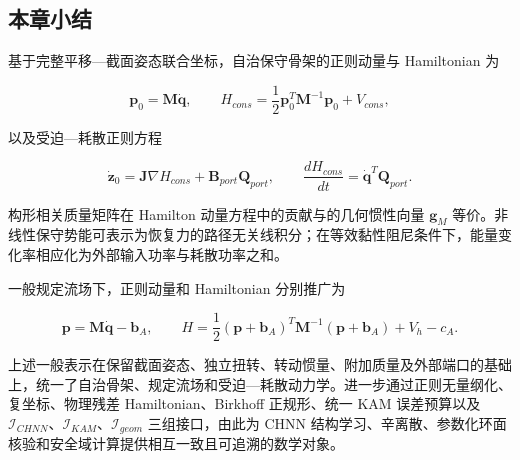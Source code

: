 \subsection{本章小结}\label{sec:hamiltonian-3-8}

基于完整平移---截面姿态联合坐标，自治保守骨架的正则动量与 Hamiltonian 为

\begin{equation}
\label{eq:hamiltonian-3-105}
\boxed{\mathbf{p}_{0} = \mathbf{M}\dot{\mathbf{q}},\quad\quad H_{cons} = \frac{1}{2}\mathbf{p}_{0}^{T}\mathbf{M}^{- 1}\mathbf{p}_{0} + V_{cons},}
\end{equation}

以及受迫---耗散正则方程

\begin{equation}
\label{eq:hamiltonian-3-106}
\boxed{{\dot{\mathbf{z}}}_{0} = \mathbf{J}\nabla H_{cons} + \mathbf{B}_{port}\mathbf{Q}_{port},\quad\quad\frac{dH_{cons}}{dt} = {\dot{\mathbf{q}}}^{T}\mathbf{Q}_{port}.}
\end{equation}

构形相关质量矩阵在 Hamilton 动量方程中的贡献与的几何惯性向量 \(\mathbf{g}_{M}\) 等价。非线性保守势能可表示为恢复力的路径无关线积分；在等效黏性阻尼条件下，能量变化率相应化为外部输入功率与耗散功率之和。

一般规定流场下，正则动量和 Hamiltonian 分别推广为

\begin{equation}
\label{eq:hamiltonian-3-107}
\boxed{\mathbf{p} = \mathbf{M}\dot{\mathbf{q}} - \mathbf{b}_{A},\quad\quad H = \frac{1}{2}\left( \mathbf{p} + \mathbf{b}_{A} \right)^{T}\mathbf{M}^{- 1}\left( \mathbf{p} + \mathbf{b}_{A} \right) + V_{h} - c_{A}.}
\end{equation}

上述一般表示在保留截面姿态、独立扭转、转动惯量、附加质量及外部端口的基础上，统一了自治骨架、规定流场和受迫---耗散动力学。进一步通过正则无量纲化、复坐标、物理残差 Hamiltonian、Birkhoff 正规形、统一 KAM 误差预算以及 \(\mathcal{I}_{CHNN}\)、\(\mathcal{I}_{KAM}\)、\(\mathcal{I}_{geom}\) 三组接口，由此为 CHNN 结构学习、辛离散、参数化环面核验和安全域计算提供相互一致且可追溯的数学对象。
